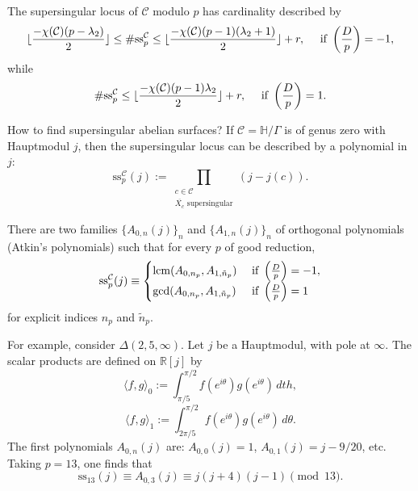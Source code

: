 \documentclass[reqno]{amsart} 
\begin{document}
\begin{theorem}[B--Li, 2024]
  The supersingular locus of $\mathcal{C}$ modulo $p$ has cardinality described by
  \begin{align*}
    \lfloor \frac{- \chi(\mathcal{C})(p - \lambda_2)}{2} \rfloor \leq
    \#\mathrm{ss}_p^{\mathcal{C}}
    \leq \lfloor
    \frac{- \chi(\mathcal{C})(p - 1)(\lambda_2 + 1)}{2}\rfloor + r, \quad \text{ if } \left( \frac{D}{p} \right) = -1,
  \end{align*}
  while
  \begin{equation*}
    \# \mathrm{ss}_p^{\mathcal{C}}
    \leq \lfloor \frac{- \chi(\mathcal{C})(p - 1) \lambda_2}{2} \rfloor + r,
    \quad \text{ if } \left( \frac{D}{p} \right) = 1.
  \end{equation*}
\end{theorem}

How to find supersingular abelian surfaces?  If $\mathcal{C} = \mathbb{H} / \Gamma$  is of genus zero with Hauptmodul $j$, then the supersingular locus can be described by a polynomial in $j$:
\begin{equation*}
  \mathrm{ss}_p^{\mathcal{C}}(j) :=
  \prod_{
    \substack{
      c \in \mathcal{C}  \\
      \overline{X_c} \text{ supersingular}      
    }
  }
  \left( j - j(c) \right).
\end{equation*}

\begin{theorem}[B.--Li, 2024]
  There are two families $\{A_{0, n}(j)\}_n$ and $\{A_{1, n}(j)\}_n$ of orthogonal polynomials (Atkin's polynomials) such that for every $p$ of good reduction,
  \begin{equation*}
    \mathrm{ss}_p^{\mathcal{C}}(j) \equiv
    \begin{cases}
      \operatorname{lcm}(A_{0, n_p}, A_{1, \tilde{n}_p})      & \text{ if } \left( \frac{D}{p} \right) = -1, \\
      \gcd(A_{0, n_p}, A_{1, \tilde{n}_p})                                                & \text{ if } \left( \frac{D}{p} \right) = 1
    \end{cases}
  \end{equation*}
  for explicit indices $n_p$ and $\tilde{n}_p$.
\end{theorem}

For example, consider $\Delta(2, 5, \infty)$.  Let $j$ be a Hauptmodul, with pole at $\infty$.  The scalar products are defined on $\mathbb{R}[j]$ by
\begin{equation*}
  \langle f, g \rangle_0 :=
  \int_{\pi / 5}^{\pi / 2}
  f(e^{i \theta})
  g(e^{i \theta}) \, d th,
\end{equation*}
\begin{equation*}
  \langle f, g \rangle_1 := \int_{2 \pi / 5}^{\pi / 2}
  f(e^{i \theta}) g(e^{i \theta}) \, d \theta.
\end{equation*}
The first polynomials $A_{0, n}(j)$ are: $A_{0, 0}(j) = 1$, $A_{0, 1}(j) = j - 9/20$, etc.  Taking $p = 13$, one finds that
\begin{equation*}
  \mathrm{ss}_{13}(j) \equiv A_{0, 3}(j) \equiv j(j + 4)(j - 1) \pmod{13}.
\end{equation*}
\end{document}
